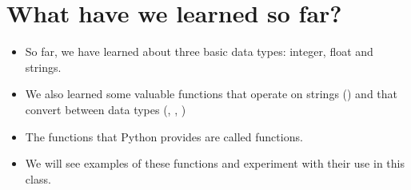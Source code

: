 \documentclass[letterpaper,10pt,english]{sphinxmanual}
\begin{document}
\section{What have we learned so far?}
\label{\detokenize{lecture_notes/lec04_modules_functions1:what-have-we-learned-so-far}}\begin{itemize}
\item {} 
So far, we have learned about three basic data types: integer, float
and strings.

\item {} 
We also learned some valuable functions that operate on strings
() and that convert between data types (, , )
\begin{quote}

%
\begin{sphinxVerbatim}[commandchars=\\\{\}]
  
\end{sphinxVerbatim}
\end{quote}

\item {} 
The functions that Python provides are called  functions.

\item {} 
We will see examples of these functions and experiment with their
use in this class.

\end{itemize}
\end{document}
